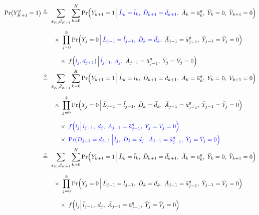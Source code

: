 \begin{align*}
        \Pr\bigl(Y_{K+1}^{g} = 1\bigr)
        &\stackrel{a}{=}\;
        \sum_{\bar{x}_K, \bar{d}_{K+1}} \sum_{k=0}^K 
            \Pr\Bigl(Y_{k+1} = 1 \,\Big|\,\hlm{\bar{L}_k = \bar{l}_k,\;\bar{D}_{k+1}=\bar{d}_{k+1}},\;\bar{A}_k=\bar{a}^g_k,\; \bar{Y}_k=0,\;\bar{V}_{k+1}=0 \Bigr) \\[6pt]
        &\quad\quad \times\;
        \prod_{j=0}^{k} \Pr\Bigl(Y_j=0 \,\Big|\, \hlm{\bar{L}_{j-1} = \bar{l}_{j-1},\;\bar{D}_{k}=\bar{d}_k},\;\bar{A}_{j-1} = \bar{a}^g_{j-1},\;\bar{Y}_{j-1} = \bar{V}_j = 0 \Bigr) \\[6pt]
        &\quad\quad\quad \times\;
          f\Bigl(\hlm{l_j,d_{j+1}}) \,\Big|\,\hlm{\bar{l}_{j-1},\;d_{j}},\; \bar{A}_{j-1} = \bar{a}^g_{j-1},\; \bar{Y}_{j} =\bar{V}_j = 0 \Bigr)\\
          &\stackrel{b}{=}\;
          \sum_{\bar{x}_K, \bar{d}_{K+1}} \sum_{k=0}^K 
              \Pr\Bigl(Y_{k+1} = 1 \,\Big|\,\bar{L}_k = \bar{l}_k,\;\bar{D}_{k+1}=\bar{d}_{k+1},\;\bar{A}_k=\bar{a}^g_k,\; \bar{Y}_k=0,\;\bar{V}_{k+1}=0 \Bigr) \\[6pt]
          &\quad\quad \times\;
          \prod_{j=0}^{k} \Pr\Bigl(Y_j=0 \,\Big|\, \bar{L}_{j-1} = \bar{l}_{j-1},\;\bar{D}_{k}=\bar{d}_k,\;\bar{A}_{j-1} = \bar{a}^g_{j-1},\;\bar{Y}_{j-1} = \bar{V}_j = 0 \Bigr) \\[6pt]
          &\quad\quad\quad \times\;
            \hlm{f\Bigl(l_j \Big|\,\bar{l}_{j-1},\;d_{j},\; \bar{A}_{j-1} = \bar{a}^g_{j-1},\; \bar{Y}_{j} =\bar{V}_j = 0 \Bigr)}\\
        &\quad\quad\quad \times\;
        \hlm{\Pr(D_{j+1}=d_{j+1} \,\Big|\,\bar{l}_{j},\;\bar{D}_j = \bar{d}_{j},\; \bar{A}_{j-1} = \bar{a}^g_{j-1},\; \bar{Y}_{j} =\bar{V}_j = 0 \Bigr)}\\
        &\stackrel{c}{=}\;
          \sum_{\bar{x}_K, \bar{d}_{K+1}} \sum_{k=0}^K 
              \Pr\Bigl(Y_{k+1} = 1 \,\Big|\,\bar{L}_k = \bar{l}_k,\;\bar{D}_{k+1}=\bar{d}_{k+1},\;\bar{A}_k=\bar{a}^g_k,\; \bar{Y}_k=0,\;\bar{V}_{k+1}=0 \Bigr) \\[6pt]
          &\quad\quad \times\;
          \prod_{j=0}^{k} \Pr\Bigl(Y_j=0 \,\Big|\, \bar{L}_{j-1} = \bar{l}_{j-1},\;\bar{D}_{k}=\bar{d}_k,\;\bar{A}_{j-1} = \bar{a}^g_{j-1},\;\bar{Y}_{j-1} = \bar{V}_j = 0 \Bigr) \\[6pt]
          &\quad\quad\quad \times\;
            f\Bigl(l_j \Big|\,\bar{l}_{j-1},\;d_{j},\; \bar{A}_{j-1} = \bar{a}^g_{j-1},\; \bar{Y}_{j} =\bar{V}_j = 0 \Bigr)\\

\end{align*}
